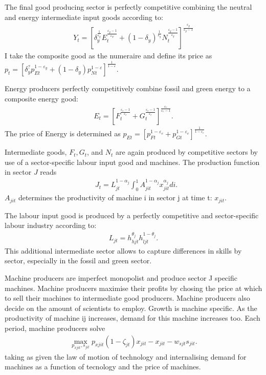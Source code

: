 The final good producing sector is perfectly competitive combining the neutral and energy intermediate input goods according to:
\begin{align}
Y_t=\left[\delta_y^\frac{1}{\varepsilon_y}E_{t}^{\frac{\varepsilon_y-1}{\varepsilon_Y}}+(1-\delta_y)^\frac{1}{\varepsilon_y}N_{t}^{\frac{\varepsilon_y-1}{\varepsilon_y}}\right]^\frac{\varepsilon_y}{\varepsilon_y-1}
\end{align} 
I take the composite good as the numeraire and define its price as $p_t=\left[\delta_y^?p_{Et}^{1-\varepsilon_y}+(1-\delta_y)p_{Nt}^{1-\varepsilon}\right]^{\frac{1}{1-\varepsilon}}$.

Energy producers perfectly competitively combine fossil and green energy to a composite energy good:
\begin{align}
E_t=\left[F_t^\frac{\varepsilon_e-1}{\varepsilon_e}+G_t^\frac{\varepsilon_e-1}{\varepsilon_e}\right]^\frac{\varepsilon_e}{\varepsilon_e-1}.
\end{align}
The price of Energy is determined as  $p_{Et}= \left[p_{Ft}^{1-\varepsilon_e}+p_{Gt}^{1-\varepsilon_e}\right]^\frac{1}{{1-\varepsilon_e}}$.

Intermediate goods, $F_t, G_t$, and $N_t$ are again produced by competitive sectors by use of a sector-specific labour input good and machines. The production function in sector $J$ reads
\begin{align}
&J_{t}= L_{jt}^{1-\alpha_j}\int_{0}^{1}A_{jit}^{1-\alpha_j}x_{jit}^{\alpha_j} di.
\end{align}
$A_{jit}$ determines the productivity of machine i in sector j at time t: $x_{jit}$.

The labour input good is produced by a perfectly competitive and sector-specific labour industry according to: 
\begin{align}
L_{jt}=h_{hjt}^{\theta_j}h_{ljt}^{1-\theta_j}.
\end{align}
This additional intermediate sector allows to capture differences in skills by sector, especially in the fossil and green sector.

Machine producers are imperfect monopolist and produce sector J specific machines. Machine producers maximise their profits by chosing the price at which to sell their machines to intermediate good producers. Machine producers also decide on the amount of scientists to employ. Growth is machine specific. As the productivity of machine ij increases, demand for this machine increases too. 
Each period, machine producers solve
\begin{align}
\underset{p_{xjit}, s_{jit}}{\max}p_{xjit}(1-\zeta_{jt})x_{jit}-x_{jit}-w_{sjt}s_{jit}.
\end{align}
taking as given the law of motion of technology and internalising demand for machines as a function of tecnology and the price of machines. 

